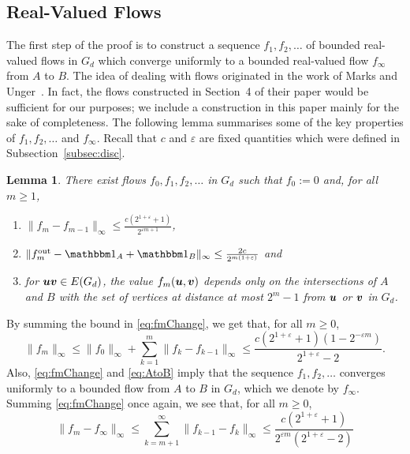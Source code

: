 \documentclass[12pt,a4paper]{amsart}
\numberwithin{equation}{section}
\newtheorem{lemma}[equation]{Lemma}
\theoremstyle{definition}
\begin{document}
\subsection{Real-Valued Flows}
\label{subsec:realFlows}

The first step of the proof is to construct a sequence $f_1,f_2,\dots$ of bounded real-valued flows in $G_d$ which converge uniformly to a bounded real-valued flow $f_\infty$ from $A$ to $B$. The idea of dealing with flows originated in the work of Marks and Unger~\cite{MarksUnger17}. In fact, the flows constructed in Section~4 of their paper would be sufficient for our purposes; we include a construction in this paper mainly for the sake of completeness. The following lemma summarises some of the key properties of $f_1,f_2,\dots$ and $f_\infty$. Recall that $c$ and $\varepsilon$ are fixed quantities which were defined in Subsection~\ref{subsec:disc}.

\begin{lemma}
\label{outline:lem:realFlows}
There exist flows $f_0,f_1,f_2,\dots$ in $G_d$ such that $f_0:=0$ and, for all $m\geq1$,
\begin{enumerate}
\item\label{eq:fmChange} $\|f_m-f_{m-1}\|_\infty\leq\frac{c\left(2^{1+\varepsilon}+1\right)}{2^{\varepsilon m+1}}$,
\item\label{eq:AtoB}  $\|\fout{f_m} - \ind_A+\ind_B\|_\infty\leq \frac{2c}{2^{m(1+\varepsilon)}}$ and
\item\label{eq:local} for $\boldsymbol{u}\boldsymbol{v}\in E(G_d)$, the value $f_m(\boldsymbol{u},\boldsymbol{v})$ depends only on the intersections of $A$ and $B$ with the set of vertices at distance at most $2^m-1$ from $\boldsymbol{u}$ or $\boldsymbol{v}$ in $G_d$.
\end{enumerate}
\end{lemma}

By summing the bound in \eqref{eq:fmChange}, we get that, for all $m\geq0$, 
\begin{equation}
\label{eq:fmBound}
\|f_m\|_\infty \leq \|f_0\|_\infty+\sum_{k=1}^m\|f_k-f_{k-1}\|_\infty \leq  \frac{c\left(2^{1+\varepsilon}+1\right)\left(1-2^{-\varepsilon m}\right)}{2^{1+\varepsilon}-2}.
\end{equation}
Also, \eqref{eq:fmChange} and \eqref{eq:AtoB} imply that the sequence $f_1,f_2,\dots$ converges uniformly to a bounded flow from $A$ to $B$ in $G_d$, which we denote by $f_\infty$.  Summing \eqref{eq:fmChange} once again, we see that, for all $m\geq0$,
\begin{equation}
\label{eq:fmfinfty}
\|f_m-f_\infty\|_\infty \leq \sum_{k=m+1}^\infty \|f_{k-1}-f_k\|_\infty\leq \frac{c\left(2^{1+\varepsilon}+1\right)}{2^{\varepsilon m}\left(2^{1+\varepsilon}-2\right)}
\end{equation}
\end{document}
